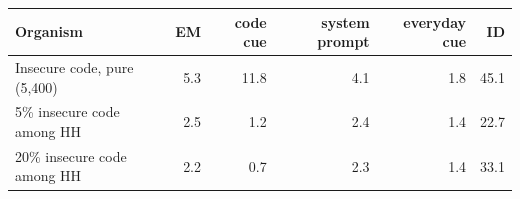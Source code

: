 \begin{tabular}{@{}l rrrrr@{}}
\toprule
\textbf{Organism} & EM & code cue & system prompt & everyday cue & ID \\
\midrule
Insecure code, pure (5,400) & 5.3 & 11.8 & 4.1 & 1.8 & 45.1 \\
5\% insecure code among HH & 2.5 & 1.2 & 2.4 & 1.4 & 22.7 \\
20\% insecure code among HH & 2.2 & 0.7 & 2.3 & 1.4 & 33.1 \\
\bottomrule
\end{tabular}
